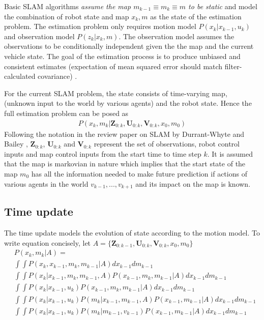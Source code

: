 \documentclass[conference]{IEEEtran}
\begin{document}
Basic SLAM algorithms \textit{assume the map $m_{k-1} \equiv m_k \equiv m$ to be static} and model the combination of robot state and map $x_k,m$ as the state of the estimation problem. The estimation problem only requires motion model $P(x_k|x_{k-1},u_k)$ and observation model $P(z_k|x_k,m)$. The observation model assumes the observations to be conditionally independent given the the map and the current vehicle state. The goal of the estimation process is to produce unbiased and consistent estimates (expectation of mean squared error should match filter-calculated covariance) \cite{yaakov2001estimation}.

For the current SLAM problem, the state consists of time-varying map, (unknown input to the world by various agents) and the robot state. Hence the full estimation problem can be posed as 
\begin{align}
P(x_k,m_k|\mathbf{Z}_{0:k},\mathbf{U}_{0:k},\mathbf{V}_{0:k},x_0,m_0)
\end{align}
Following the notation in the review paper on SLAM by Durrant-Whyte and Bailey \cite{durrant2006simultaneous}, $\mathbf{Z}_{0:k}$, $\mathbf{U}_{0:k}$ and $\mathbf{V}_{0:k}$ represent the set of observations, robot control inputs and map control inputs from the start time to time step $k$. It is assumed that the map is markovian in nature which implies that the start state of the map $m_0$ has all the information needed to make future prediction if actions of various agents in the world $v_{k-1},...,v_{k+1}$ and its impact on the map is known.

\subsection{Time update} The time update models the evolution of state according to the motion model. To write equation concisely, let $A =\{ \mathbf{Z}_{0:k-1},\mathbf{U}_{0:k},\mathbf{V}_{0:k},x_0,m_0 \}$
\begin{align}
&P(x_k,m_k|A) = \nonumber \\
&\int \int P(x_k,x_{k-1},m_k,m_{k-1}|A) dx_{k-1} dm_{k-1} \nonumber \\
&\int \int P(x_k|x_{k-1},m_k,m_{k-1},A)P(x_{k-1},m_k,m_{k-1}|A) dx_{k-1}dm_{k-1} \nonumber \\
&\int \int P(x_k|x_{k-1},u_k)P(x_{k-1},m_k,m_{k-1}|A) dx_{k-1}dm_{k-1} \nonumber \\
&\int \int P(x_k|x_{k-1},u_k)P(m_k|x_{k-1},m_{k-1},A)P(x_{k-1},m_{k-1}|A)  dx_{k-1}dm_{k-1} \nonumber \\
&\int \int P(x_k|x_{k-1},u_k)P(m_k|m_{k-1},v_{k-1})P(x_{k-1},m_{k-1}|A) dx_{k-1}dm_{k-1} \nonumber \\
\label{eq:time_update}
\end{align}
\end{document}
